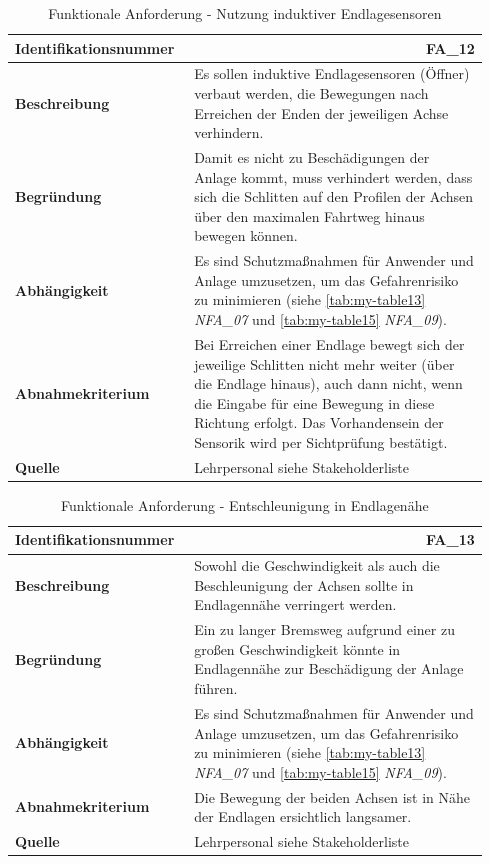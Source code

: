 \documentclass[../../../Bachelorarbeit.tex]{subfiles}
\begin{document}
\begin{table}[H]
    \centering
    \begin{tabular}{ p{0.34\linewidth}  p{0.6\linewidth} } 
        \hline
        \textbf{Identifikationsnummer}  & \multicolumn{1}{r}{FA\_12} \\ \hline
        \textbf{Beschreibung}           & Es sollen induktive Endlagesensoren (Öffner) verbaut werden, die Bewegungen nach Erreichen der Enden der jeweiligen Achse verhindern. \\
        \textbf{Begründung}             & Damit es nicht zu Beschädigungen der Anlage kommt, muss verhindert werden, dass sich die Schlitten auf den Profilen der Achsen über den maximalen Fahrtweg hinaus bewegen können. \\
        \textbf{Abhängigkeit}           & Es sind Schutzmaßnahmen für Anwender und Anlage umzusetzen, um das Gefahrenrisiko zu minimieren (siehe \autoref{tab:my-table13} \textit{NFA\_07} und \autoref{tab:my-table15} \textit{NFA\_09}). \\
        \textbf{Abnahmekriterium}       & Bei Erreichen einer Endlage bewegt sich der jeweilige Schlitten nicht mehr weiter (über die Endlage hinaus), auch dann nicht, wenn die Eingabe für eine Bewegung in diese Richtung erfolgt. Das Vorhandensein der Sensorik wird per Sichtprüfung bestätigt. \\
        \textbf{Quelle}                 & Lehrpersonal siehe Stakeholderliste \\ \hline
    \end{tabular}
    \caption[\acs{fa} - Nutzung induktiver Endlagesensoren]{Funktionale Anforderung - Nutzung induktiver Endlagesensoren}
    \label{tab:my-table5}
\end{table}
\begin{table}[H]
    \centering
    \begin{tabular}{ p{0.34\linewidth}  p{0.6\linewidth} } 
        \hline
        \textbf{Identifikationsnummer}  & \multicolumn{1}{r}{FA\_13} \\ \hline
        \textbf{Beschreibung}           & Sowohl die Geschwindigkeit als auch die Beschleunigung der Achsen sollte in Endlagennähe verringert werden. \\
        \textbf{Begründung}             & Ein zu langer Bremsweg aufgrund einer zu großen Geschwindigkeit könnte in Endlagennähe zur Beschädigung der Anlage führen. \\
        \textbf{Abhängigkeit}           & Es sind Schutzmaßnahmen für Anwender und Anlage umzusetzen, um das Gefahrenrisiko zu minimieren (siehe \autoref{tab:my-table13} \textit{NFA\_07} und \autoref{tab:my-table15} \textit{NFA\_09}). \\
        \textbf{Abnahmekriterium}       & Die Bewegung der beiden Achsen ist in Nähe der Endlagen ersichtlich langsamer. \\
        \textbf{Quelle}                 & Lehrpersonal siehe Stakeholderliste \\ \hline
    \end{tabular}
    \caption[\acs{fa} - Entschleunigung in Endlagenähe]{Funktionale Anforderung - Entschleunigung in Endlagenähe}
    \label{tab:my-table6}
\end{table}
\end{document}
